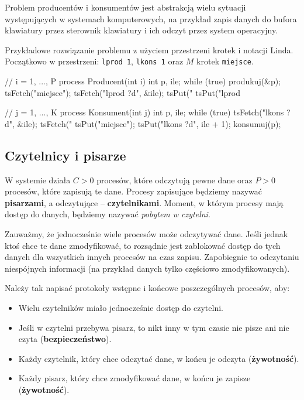 Problem producentów i konsumentów jest abstrakcją wielu sytuacji występujących w systemach komputerowych, na przykład zapis danych do bufora klawiatury przez sterownik klawiatury i ich odczyt przez system operacyjny.

Przykładowe rozwiązanie problemu z użyciem przestrzeni krotek i notacji Linda. Początkowo w przestrzeni: \texttt{lprod 1}, \texttt{lkons 1} oraz $M$ krotek \texttt{miejsce}.
\begin{java}
    // i = 1, ..., P
    process Producent(int i) {
        int p, ile;
        while (true) {
            produkuj(&p);
            tsFetch("miejsce");
            tsFetch("lprod ?d", &ile);
            tsPut("%
            tsPut("lprod %
        }
    }

    // j = 1, ..., K
    process Konsument(int j) {
        int p, ile;
        while (true) {
            tsFetch("lkons ?d", &ile);
            tsFetch("%
            tsPut("miejsce");
            tsPut("lkons ?d", ile + 1);
            konsumuj(p);
        }
    }
\end{java}

\subsection{Czytelnicy i pisarze}

W systemie działa $C > 0$ procesów, które odczytują pewne dane oraz $P > 0$ procesów, które zapisują te dane. Procesy zapisujące będziemy nazywać \textbf{pisarzami}, a odczytujące -- \textbf{czytelnikami}. Moment, w którym procesy mają dostęp do danych, będziemy nazywać \textit{pobytem w czytelni}.

Zauważmy, że jednocześnie wiele procesów może odczytywać dane. Jeśli jednak ktoś chce te dane zmodyfikować, to rozsądnie jest zablokować dostęp do tych danych dla wszystkich innych procesów na czas zapisu. Zapobiegnie to odczytaniu niespójnych informacji (na przykład danych tylko częściowo zmodyfikowanych).

Należy tak napisać protokoły wstępne i końcowe poszczególnych procesów, aby:
\begin{itemize}
    \item Wielu czytelników miało jednocześnie dostęp do czytelni.
    \item Jeśli w czytelni przebywa pisarz, to nikt inny w tym czasie nie pisze ani nie czyta (\textbf{bezpieczeństwo}).
    \item Każdy czytelnik, który chce odczytać dane, w końcu je odczyta (\textbf{żywotność}).
    \item Każdy pisarz, który chce zmodyfikować dane, w końcu je zapisze (\textbf{żywotność}).
\end{itemize}

